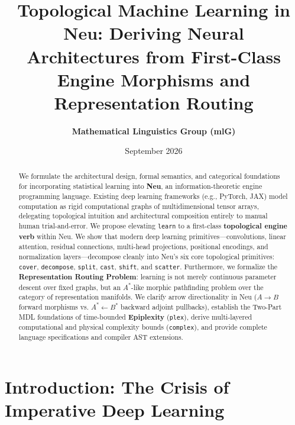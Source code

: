 \documentclass[11pt]{article}
\title{\textbf{Topological Machine Learning in Neu: Deriving Neural Architectures from First-Class Engine Morphisms and Representation Routing}}
\author{\textbf{Mathematical Linguistics Group (mlG)}}
\date{September 2026}
\begin{document}
\maketitle

\begin{abstract}
We formulate the architectural design, formal semantics, and categorical foundations for incorporating statistical learning into \textbf{Neu}, an information-theoretic engine programming language. Existing deep learning frameworks (e.g., PyTorch, JAX) model computation as rigid computational graphs of multidimensional tensor arrays, delegating topological intuition and architectural composition entirely to manual human trial-and-error. We propose elevating \texttt{learn} to a first-class \textbf{topological engine verb} within Neu. We show that modern deep learning primitives---convolutions, linear attention, residual connections, multi-head projections, positional encodings, and normalization layers---decompose cleanly into Neu's six core topological primitives: \texttt{cover}, \texttt{decompose}, \texttt{split}, \texttt{cast}, \texttt{shift}, and \texttt{scatter}. Furthermore, we formalize the \textbf{Representation Routing Problem}: learning is not merely continuous parameter descent over fixed graphs, but an $A^*$-like morphic pathfinding problem over the category of representation manifolds. We clarify arrow directionality in Neu ($A \to B$ forward morphisms vs. $A^* \leftarrow B^*$ backward adjoint pullbacks), establish the Two-Part MDL foundations of time-bounded \textbf{Epiplexity} (\texttt{plex}), derive multi-layered computational and physical complexity bounds (\texttt{complex}), and provide complete language specifications and compiler AST extensions.
\end{abstract}

\section{Introduction: The Crisis of Imperative Deep Learning}
\end{document}
